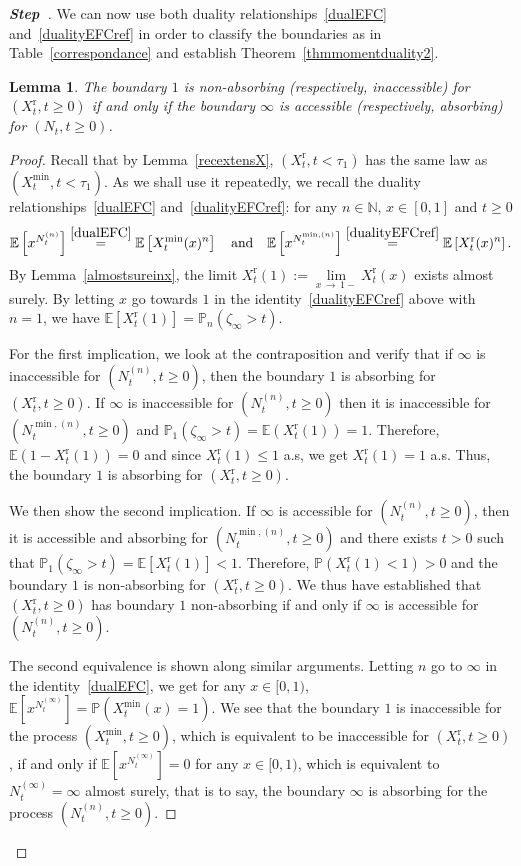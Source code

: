 \documentclass[10pt]{amsart}
\newtheorem{lemm}[theo]{Lemma}\newtheorem{prop}[theo]{Proposition}\newtheorem{coro}[theo]{Corollary}\newtheorem{conj}[theo]{Conjecture}
\theoremstyle{definition}\newtheorem{defi}[theo]{Definition}\newtheorem{rema}[theo]{Remark}\newtheorem{exam}[theo]{Example}\newtheorem{exem}[theo]{Example}\newtheorem{nota}[theo]{Notation}
\newcommand{\rmr}{\mathrm{r}}
\newcommand{\bbN}{\mathbb{N}}
\newcommand{\bbE}{\mathbb{E}}
\newcommand{\bbP}{\mathbb{P}}
\newcounter{stepcount}
\newenvironment{step}{\refstepcounter{stepcount}\begin{proof}[\textbf{Step~\thestepcount}]}{\end{proof}}
\begin{document}
\begin{step}
We can now use both duality relationships~\eqref{dualEFC} and~\eqref{dualityEFCref} in order to classify the boundaries as in Table~\ref{correspondance} and establish Theorem~\ref{thmmomentduality2}.

\begin{lemm}\label{correspond}
The boundary $1$ is non-absorbing (respectively, inaccessible) for $(X_t^{\rmr},t\geq 0)$ if and only if the boundary $\infty$ is accessible (respectively, absorbing) for $(N_t,t\geq 0)$.
\end{lemm}
\pagebreak
\begin{proof}
Recall that by Lemma~\ref{recextensX}, $(X_t^{\rmr},t<\tau_1)$ has the same law as $(X^{\min}_t,t<\tau_1)$. As we shall use it repeatedly, we recall the duality relationships~\eqref{dualEFC} and~\eqref{dualityEFCref}: for any $n\in \bbN$, $x\in [0,1]$ and $t\geq 0$
\[
\bbE\left[x^{N^{(n)}_t}\right]\overset{\eqref{dualEFC}}{=}\bbE\left[X^{\min}_t(x)^n\right] \quad\text{and}\quad\bbE\left[x^{N^{\min,(n)}_t}\right]\overset{\eqref{dualityEFCref}}{=}\bbE\left[X^{\rmr}_t(x)^n\right].
\]
By Lemma~\ref{almostsureinx}, the limit $X^{\rmr}_t(1):=\underset{x\,\rightarrow\,1-}{\lim} X^{\rmr}_t(x)$ exists almost surely. By letting $x$ go towards $1$ in the identity~\eqref{dualityEFCref} above with $n=1$, we have $\bbE[X^{\rmr}_t(1)]=\bbP_n(\zeta_{\infty}>t)$.

For the first implication, we look at the contraposition and verify that if $\infty$ is inaccessible for $(N^{(n)}_t,t\geq 0)$, then the boundary $1$ is absorbing for $(X_t^{\rmr},t\geq 0)$. If $\infty$ is inaccessible for $(N^{(n)}_t,t\geq 0)$ then it is inaccessible for $(N^{\min,(n)}_t,t\geq 0)$ and $\bbP_1(\zeta_{\infty}>t)=\bbE(X^{\rmr}_t(1))=1$. Therefore, $\bbE(1-X^{\rmr}_t(1))=0$ and since $X^{\rmr}_t(1)\leq 1$ a.s, we get $X^{\rmr}_t(1)=1$ a.s. Thus, the boundary $1$ is absorbing for $(X_t^{\rmr},t\geq 0)$.

We then show the second implication. If $\infty$ is accessible for $(N^{(n)}_t,t\geq 0)$, then it is accessible and absorbing for $(N^{\min,(n)}_t,t\geq 0)$ and there exists $t>0$ such that $\bbP_1(\zeta_{\infty}>t)=\bbE[X^{\rmr}_t(1)]<1$. Therefore, $\bbP(X_t^{\rmr}(1)<1)>0$ and the boundary $1$ is non-absorbing for $(X_t^{\rmr},t\geq 0)$. We thus have established that $(X_t^{\rmr},t\geq 0)$ has boundary $1$ non-absorbing if and only if $\infty$ is accessible for $(N_t^{(n)},t\geq 0)$.

The second equivalence is shown along similar arguments. Letting $n$ go to $\infty$ in the identity~\eqref{dualEFC}, we get for any $x\in [0,1)$, $\bbE[x^{N^{(\infty)}_t}]=\bbP(X^{\min}_t(x)=1)$. We see that the boundary $1$ is inaccessible for the process $(X^{\min}_t,t\geq 0)$, which is equivalent to be inaccessible for $(X_t^{\rmr},t\geq 0)$, if and only if $\bbE[x^{N^{(\infty)}_t}]=0$ for any $x\in [0,1)$, which is equivalent to $N^{(\infty)}_t=\infty$ almost surely, that is to say, the boundary $\infty$ is absorbing for the process $(N_t^{(n)},t\geq 0)$.
\end{proof}\let\qed\relax
\end{step}
\end{document}
